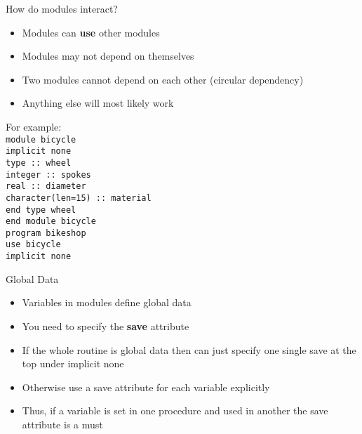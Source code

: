 \documentclass{beamer}
\begin{document}
\begin{frame}{How do modules interact?}

  \begin{itemize}
    \item Modules can \textbf{use} other modules
    \vfill\item Modules may not depend on themselves
    \vfill\item Two modules cannot depend on each other (circular dependency)
    \vfill\item Anything else will most likely work
  \end{itemize}
  \vfill
  \scriptsize
  For example: \\
  \texttt{module bicycle} \\
    \hspace{0.1cm}\texttt{implicit none}\\
    \hspace{0.1cm} \texttt{type :: wheel}\\
      \hspace{0.2cm}\texttt{integer :: spokes}\\
      \hspace{0.2cm}\texttt{real :: diameter}\\
      \hspace{0.2cm}\texttt{character(len=15) :: material}\\
    \hspace{0.1cm}\texttt{end type wheel}\\
  \texttt{end module bicycle}\\ 
  \vfill
  \texttt{program bikeshop}\\
    \hspace{0.1cm} \texttt{use bicycle}\\
    \hspace{0.1cm} \texttt{implicit none}

\end{frame}
\begin{frame}{Global Data}

  \begin{itemize}
    \item  Variables in modules define global data
    \vfill\item  You need to specify the \textbf{save} attribute
    \vfill\item  If the whole routine is global data then can just specify one single save at the top under implicit none
    \vfill\item  Otherwise use a save attribute for each variable explicitly
    \vfill\item  Thus, if a variable is set in one procedure and used in another the save attribute is a must
  \end{itemize}

\end{frame}
\end{document}
